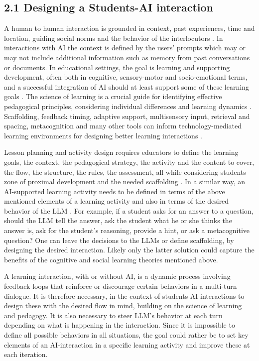 \documentclass[fleqn,10pt]{wlscirep}
\begin{document}
\subsection*{2.1  Designing a Students-AI interaction}

A human to human interaction is grounded in context, past experiences, time and location, guiding social norms and the behavior of the interlocutors \cite{Clark1996}. In interactions with AI the context is defined by the users' prompts which may or may not include additional information such as memory from past conversations or documents. In educational settings, the goal is learning and supporting development, often both in cognitive, sensory-motor and socio-emotional terms, and a successful integration of AI should at least support some of these learning goals \cite{ZawackiRichter2025}. The science of learning is a crucial guide for identifying effective pedagogical principles, considering individual differences and learning dynamics \cite{Bjork1994, Deci1985, Roediger2011, Dunlosky2013, Weinstein2018, Dukes2019}. Scaffolding, feedback timing, adaptive support, multisensory input, retrieval and spacing, metacognition and many other tools can inform technology-mediated learning environments for designing better learning interactions \cite{Macina2023, ZawackiRichter2025}.

Lesson planning and activity design requires educators to define the learning goals, the context, the pedagogical strategy, the activity and the content to cover, the flow, the structure, the rules, the assessment, all while considering students zone of proximal development and the needed scaffolding \cite{Wood1976, Vygotsky1978}. In a similar way, an AI-supported learning activity needs to be defined in terms of the above mentioned elements of a learning activity \cite{ZawackiRichter2025} and also in terms of the desired behavior of the LLM \cite{Neugnot2026}. For example, if a student asks for an answer to a question, should the LLM tell the answer, ask the student what he or she thinks the answer is, ask for the student's reasoning, provide a hint, or ask a metacognitive question? One can leave the decisions to the LLMs or define scaffolding, by designing the desired interaction. Likely only the latter solution could capture the benefits of the cognitive and social learning theories mentioned above.

A learning interaction, with or without AI, is a dynamic process involving feedback loops that reinforce or discourage certain behaviors in a multi-turn dialogue. It is therefore necessary, in the context of students-AI interactions to design these with the desired flow in mind, building on the science of learning and pedagogy. It is also necessary to steer LLM's behavior at each turn depending on what is happening in the interaction. Since it is impossible to define all possible behaviors in all situations, the goal could rather be to set key elements of an AI-interaction in a specific learning activity and improve these at each iteration.
\end{document}
